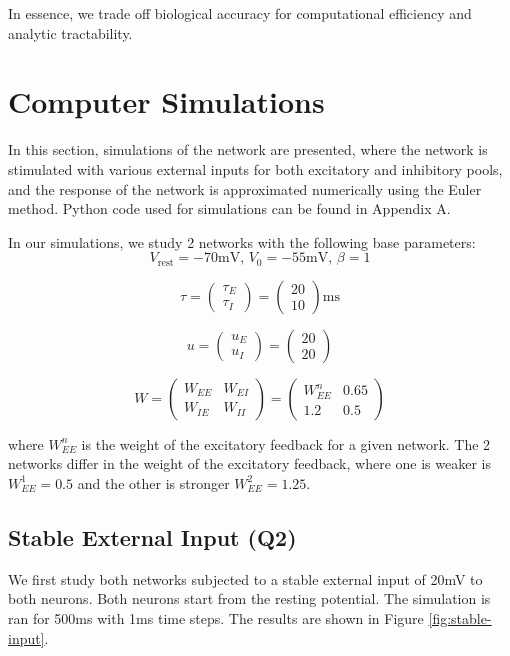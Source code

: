 \documentclass[10pt,twocolumn]{article}
\begin{document}
In essence, we trade off biological accuracy for
computational efficiency and analytic tractability.



\section{Computer Simulations}
In this section, simulations of the network are presented,
where the network is stimulated with various external inputs for
both excitatory and inhibitory pools, and the
response of the network is approximated numerically using the Euler method.
Python code used for simulations can be found in Appendix A.

In our simulations, we study 2 networks with the following base parameters:
$$
    V_{\text{rest}} = -70 \text{mV, } V_0 = -55 \text{mV, } \beta = 1
$$

$$
    \tau
    = \begin{pmatrix} \tau_E \\ \tau_I \end{pmatrix}
    = \begin{pmatrix} 20 \\ 10 \end{pmatrix}\text{ms}
$$

$$
    u
    = \begin{pmatrix} u_E \\ u_I \end{pmatrix}
    = \begin{pmatrix} 20 \\ 20 \end{pmatrix}
$$

$$
    W
    = \begin{pmatrix} W_{EE} & W_{EI} \\ W_{IE} & W_{II} \end{pmatrix}
    = \begin{pmatrix} W^n_{EE} & 0.65 \\ 1.2 & 0.5 \end{pmatrix}
$$

where $W^n_{EE}$ is the weight of the excitatory feedback for a given network.
The 2 networks differ in the weight of the excitatory feedback, where one is weaker
is $W^1_{EE} = 0.5$ and the other is stronger $W^2_{EE} = 1.25$.

\subsection{Stable External Input (Q2)}
We first study both networks subjected to a stable external input of 20mV to
both neurons.
Both neurons start from the resting potential. The simulation is ran for 500ms
with 1ms time steps. The results are shown in Figure \ref{fig:stable-input}.
\end{document}
